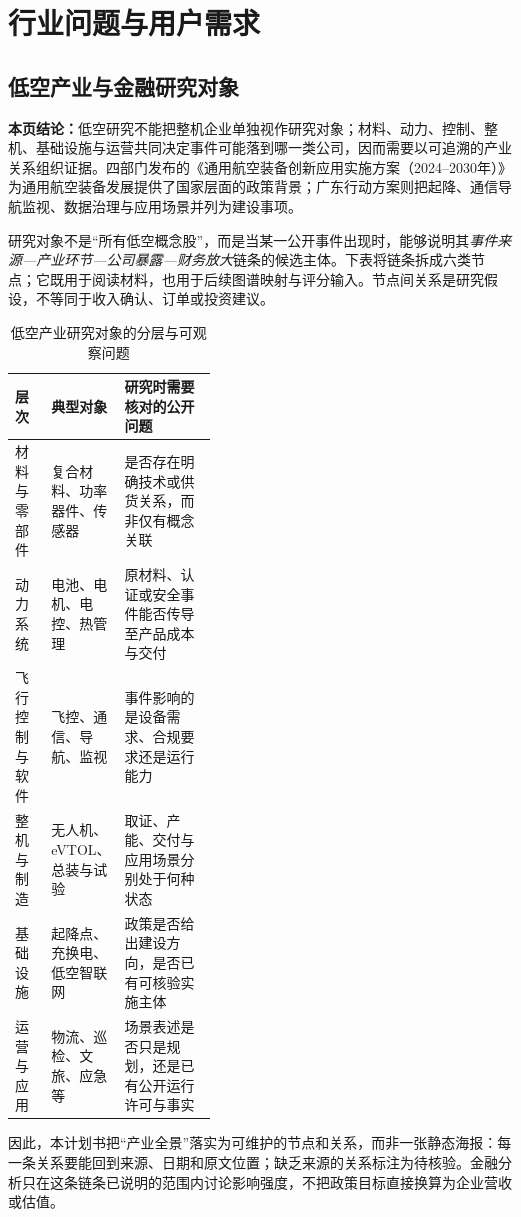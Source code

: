 \clearpage
\section{行业问题与用户需求}
\subsection*{低空产业与金融研究对象}\label{page:05}
\fi

\textbf{本页结论：}低空研究不能把整机企业单独视作研究对象；材料、动力、控制、整机、基础设施与运营共同决定事件可能落到哪一类公司，因而需要以可追溯的产业关系组织证据。四部门发布的《通用航空装备创新应用实施方案（2024--2030年）》为通用航空装备发展提供了国家层面的政策背景\cite{wty-miit-plan}；广东行动方案则把起降、通信导航监视、数据治理与应用场景并列为建设事项\cite{wty-gd-plan}。

研究对象不是“所有低空概念股”，而是当某一公开事件出现时，能够说明其\emph{事件来源—产业环节—公司暴露—财务放大}链条的候选主体。下表将链条拆成六类节点；它既用于阅读材料，也用于后续图谱映射与评分输入。节点间关系是研究假设，不等同于收入确认、订单或投资建议。

\begin{table}[htbp]
\centering
\caption{低空产业研究对象的分层与可观察问题}
\label{tab:wty-industry-layers}
\small
\begin{tabularx}{\linewidth}{p{0.18\linewidth}p{0.22\linewidth}X}
\toprule
层次 & 典型对象 & 研究时需要核对的公开问题 \\
\midrule
材料与零部件 & 复合材料、功率器件、传感器 & 是否存在明确技术或供货关系，而非仅有概念关联 \\
动力系统 & 电池、电机、电控、热管理 & 原材料、认证或安全事件能否传导至产品成本与交付 \\
飞行控制与软件 & 飞控、通信、导航、监视 & 事件影响的是设备需求、合规要求还是运行能力 \\
整机与制造 & 无人机、eVTOL、总装与试验 & 取证、产能、交付与应用场景分别处于何种状态 \\
基础设施 & 起降点、充换电、低空智联网 & 政策是否给出建设方向，是否已有可核验实施主体 \\
运营与应用 & 物流、巡检、文旅、应急等 & 场景表述是否只是规划，还是已有公开运行许可与事实 \\
\bottomrule
\end{tabularx}
\end{table}

因此，本计划书把“产业全景”落实为可维护的节点和关系，而非一张静态海报：每一条关系要能回到来源、日期和原文位置；缺乏来源的关系标注为待核验。金融分析只在这条链条已说明的范围内讨论影响强度，不把政策目标直接换算为企业营收或估值。
